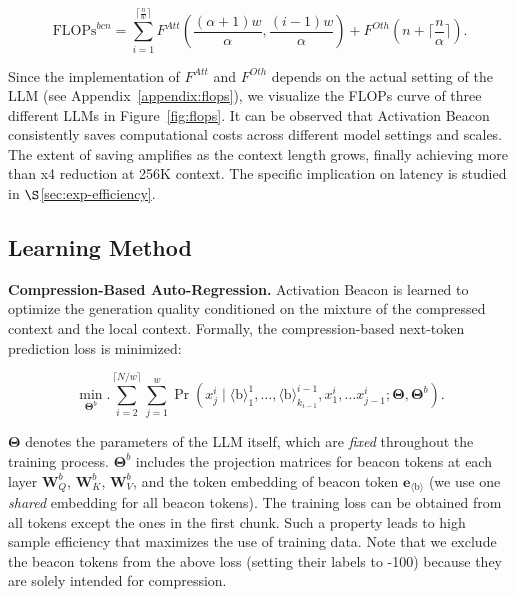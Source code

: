 \begin{equation}
    \mathrm{FLOPs}^{bcn}=\sum_{i=1}^{\lceil \frac{n}{w} \rceil}F^{Att}\left(\frac{(\alpha + 1)w}{\alpha}, \frac{(i-1)w}{\alpha}\right) + F^{Oth}(n+\lceil\frac{n}{\alpha}\rceil).
\end{equation}

Since the implementation of $F^{Att}$ and $F^{Oth}$ depends on the actual setting of the LLM (see Appendix~\ref{appendix:flops}), we visualize the FLOPs curve of three different LLMs in Figure~\ref{fig:flops}. It can be observed that Activation Beacon consistently saves computational costs across different model settings and scales. The extent of saving amplifies as the context length grows, finally achieving more than x4 reduction at 256K context. The specific implication on latency is studied in $\S$\ref{sec:exp-efficiency}.

\subsection{Learning Method}

\textbf{Compression-Based Auto-Regression.} Activation Beacon is learned to optimize the generation quality conditioned on the mixture of the compressed context and the local context. Formally, the compression-based next-token prediction loss is minimized:

\begin{equation}
    \min\limits_{\boldsymbol{\Theta}^{b}}. \sum_{i=2}^{\lceil N/w \rceil} \sum_{j=1}^{w} 
    \Pr(x^i_j\mid \langle\text{b}\rangle^1_1,\dots,\langle\text{b}\rangle^{i-1}_{k_{i-1}}, x^i_1, \dots x^i_{j-1}; \boldsymbol{\Theta}, \boldsymbol{\Theta}^{b}). 
\end{equation}

$\boldsymbol{\Theta}$ denotes the parameters of the LLM itself, which are \textit{fixed} throughout the training process. $\boldsymbol{\Theta}^b$ includes the projection matrices for beacon tokens at each layer $\boldsymbol{W}_Q^{b}$, $\boldsymbol{W}_K^{b}$, $\boldsymbol{W}_V^{b}$, and the token embedding of beacon token $\boldsymbol{e}_{\langle\text{b}\rangle}$ (we use one \textit{shared} embedding for all beacon tokens). The training loss can be obtained from all tokens except the ones in the first chunk. Such a property leads to high sample efficiency that maximizes the use of training data. Note that we exclude the beacon tokens from the above loss (setting their labels to -100) because they are solely intended for compression.

